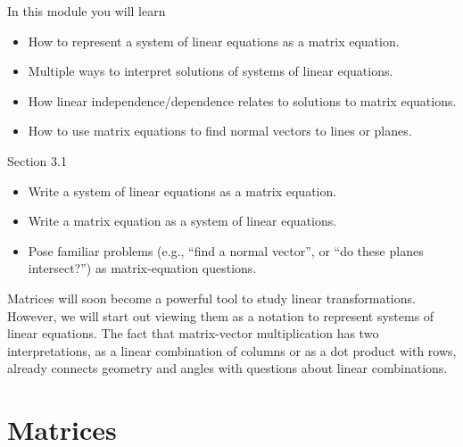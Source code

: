 \begin{module}

	In this module you will learn
	\begin{itemize}
		\item How to represent a system of linear equations as a matrix equation.
		\item Multiple ways to interpret solutions of systems of linear equations.
		\item How linear independence/dependence relates to solutions to matrix equations.
		\item How to use matrix equations to find normal vectors to lines or planes.
	\end{itemize}
	
	
	
\end{module}
\begin{lesson}

	Section 3.1

	\begin{itemize}
		\item Write a system of linear equations as a matrix equation.
		\item Write a matrix equation as a system of linear equations.
		\item Pose familiar problems (e.g., ``find a normal vector'', or
			``do these planes intersect\mbox{?}'') as matrix-equation
			questions.
	\end{itemize}

	Matrices will soon become a powerful tool to study linear transformations.
	However, we will start out viewing them as a notation to represent
	systems of linear equations. The fact that matrix-vector multiplication
	has two interpretations, as a linear combination of columns or as a dot product
	with rows, already connects geometry and angles with questions about linear combinations.

\end{lesson}
	\bookonlynewpage
\section*{Matrices}

